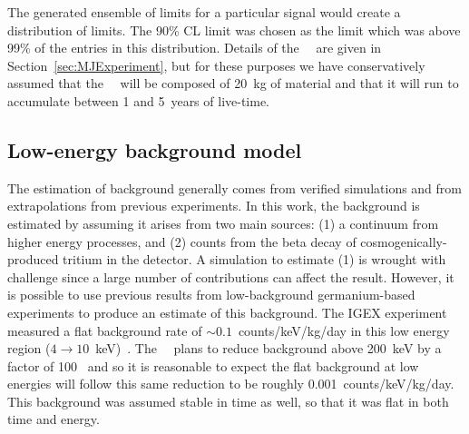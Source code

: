 The generated ensemble of limits for a particular signal would create a distribution of limits.  The 90\% CL limit was chosen as the limit which was above 99\% of the entries in this distribution.  Details of the \MJ~\minmod~are given in Section~\ref{sec:MJExperiment}, but for these purposes we have conservatively assumed that the \MJ~\minmod~will be composed of 20~kg of material and that it will run to accumulate between 1 and 5~years of live-time.  
	
		\subsection{Low-energy background model}
		\label{sec:MJLowEnergyBackgroundModel}
		
The estimation of background generally comes from verified simulations and from extrapolations from previous experiments.  In this work, the background is estimated by assuming it arises from two main sources: (1) a continuum from higher energy processes, and (2) counts from the beta decay of cosmogenically-produced tritium in the detector.  A simulation to estimate (1) is wrought with challenge since a large number of contributions can affect the result.  However, it is possible to use previous results from low-background germanium-based experiments to produce an estimate of this background.  The IGEX experiment measured a flat background rate of $\sim0.1$~counts/keV/kg/day in this low energy region ($4\to10$~keV)~\cite{Ira01}.    The \MJ~\minmod~plans to reduce background above 200~keV by a factor of 100~\cite{Gaitskell:2003zr} and so it is reasonable to expect the flat background at low energies will follow this same reduction to be roughly 0.001~counts/keV/kg/day.  This background was assumed stable in time as well, so that it was flat in both time and energy.

